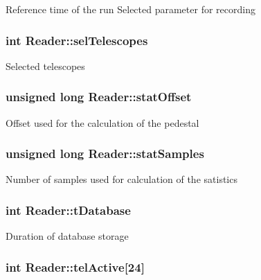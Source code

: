 Reference time of the run Selected parameter for recording \hypertarget{classReader_a822ff7808145dd73c18e03a02ff59fbe}{
\subsubsection[{sel\-Telescopes}]{\setlength{\rightskip}{0pt plus 5cm}int Reader\-::sel\-Telescopes\hspace{0.3cm}{\ttfamily [private]}}}\label{classReader_a822ff7808145dd73c18e03a02ff59fbe}
Selected telescopes \hypertarget{classReader_a8fd2d0cd7df8a4c2cf1ca350f6ca95c9}{
\subsubsection[{stat\-Offset}]{\setlength{\rightskip}{0pt plus 5cm}unsigned long Reader\-::stat\-Offset\hspace{0.3cm}{\ttfamily [private]}}}\label{classReader_a8fd2d0cd7df8a4c2cf1ca350f6ca95c9}
Offset used for the calculation of the pedestal \hypertarget{classReader_a98d0f293c15366f1efbe6722ed4fa9eb}{
\subsubsection[{stat\-Samples}]{\setlength{\rightskip}{0pt plus 5cm}unsigned long Reader\-::stat\-Samples\hspace{0.3cm}{\ttfamily [private]}}}\label{classReader_a98d0f293c15366f1efbe6722ed4fa9eb}
Number of samples used for calculation of the satistics \hypertarget{classReader_aeb5766561480656c2a2182b86e2cdae8}{
\subsubsection[{t\-Database}]{\setlength{\rightskip}{0pt plus 5cm}int Reader\-::t\-Database\hspace{0.3cm}{\ttfamily [private]}}}\label{classReader_aeb5766561480656c2a2182b86e2cdae8}
Duration of database storage \hypertarget{classReader_aaa48504eb00d9023ff126beb8b6f5c89}{
\subsubsection[{tel\-Active}]{\setlength{\rightskip}{0pt plus 5cm}int Reader\-::tel\-Active\mbox{[}24\mbox{]}\hspace{0.3cm}{\ttfamily [private]}}}\label{classReader_aaa48504eb00d9023ff126beb8b6f5c89}
